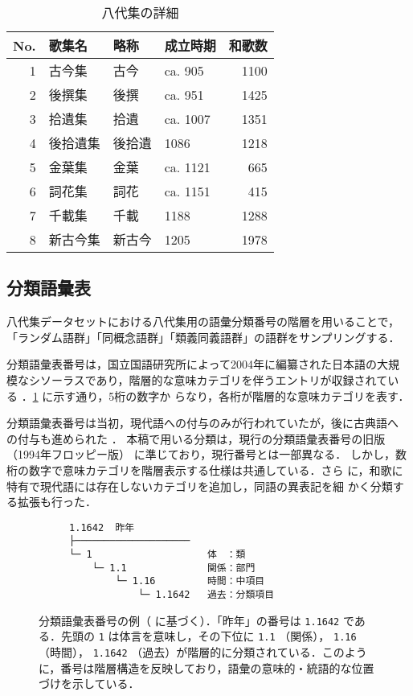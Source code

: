 \documentclass[submit]{ipsj}
\renewcommand{\ref}{\cref}
\begin{document}
\begin{table}[b]
\caption{\label{tab:org57e81bf}八代集の詳細}
\centering
\begin{tabular}{rlllr}
No. & 歌集名 & 略称 & 成立時期 & 和歌数\\
\hline
1 & 古今集 & 古今 & ca. 905 & 1100\\
2 & 後撰集 & 後撰 & ca. 951 & 1425\\
3 & 拾遺集 & 拾遺 & ca. 1007 & 1351\\
4 & 後拾遺集 & 後拾遺 & 1086 & 1218\\
5 & 金葉集 & 金葉 & ca. 1121 & 665\\
6 & 詞花集 & 詞花 & ca. 1151 & 415\\
7 & 千載集 & 千載 & 1188 & 1288\\
8 & 新古今集 & 新古今 & 1205 & 1978\\
\end{tabular}
\end{table}
\subsection{分類語彙表\label{orgfdb75d8}}
\label{sec:org66b2309}
八代集データセットにおける八代集用の語彙分類番号の階層を用いることで，
「ランダム語群」「同概念語群」「類義同義語群」の語群をサンプリングする．

分類語彙表番号は，国立国語研究所によって2004年に編纂された日本語の大規
模なシソーラスであり，階層的な意味カテゴリを伴うエントリが収録されてい
る \cite{Asahara2022CHJWLSP}．\ref{org15e70a6} に示す通り，5桁の数字か
らなり，各桁が階層的な意味カテゴリを表す．

分類語彙表番号は当初，現代語への付与のみが行われていたが，後に古典語へ
の付与も進められた \cite{Asahara2022CHJWLSP,miyazima2014Nippon}．
本稿で用いる分類は，現行の分類語彙表番号の旧版（1994年フロッピー版）
\cite{nakano1994Bunruigoihyo} に準じており，現行番号とは一部異なる．
しかし，数桁の数字で意味カテゴリを階層表示する仕様は共通している．さら
に，和歌に特有で現代語には存在しないカテゴリを追加し，同語の異表記を細
かく分類する拡張も行った．

\begin{figure}
\begin{verbatim}
  　　1.1642  昨年
  　　├────────────────────
  　　└─ 1                    体　：類
  　　    └─ 1.1              関係：部門
  　　        └─ 1.16         時間：中項目
  　　            └─ 1.1642   過去：分類項目
\end{verbatim}
\caption{\label{org15e70a6}分類語彙表番号の例（\cite{Asahara2022CHJWLSP} に基づく）．「昨年」の番号は \texttt{1.1642} である．先頭の \texttt{1} は体言を意味し，その下位に \texttt{1.1} （関係）， \texttt{1.16} （時間），  \texttt{1.1642} （過去）が階層的に分類されている．このように，番号は階層構造を反映しており，語彙の意味的・統語的な位置づけを示している．}
\end{figure}
\end{document}
